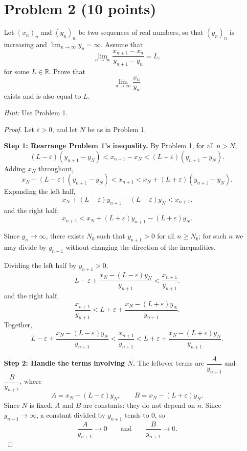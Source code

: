 \documentclass[11pt]{article}
\begin{document}
\section*{Problem 2 (10 points)}
Let $(x_n)_n$ and $(y_n)_n$ be two sequences of real numbers, so that
$(y_n)_n$ is increasing and $\lim_{n\to\infty}y_n=\infty$. Assume that
\[
  \lim_{n\to\infty}\frac{x_{n+1}-x_n}{y_{n+1}-y_n} = L,
\]
for some $L\in\mathbb{R}$. Prove that
\[
  \lim_{n\to\infty}\frac{x_n}{y_n}
\]
exists and is also equal to $L$.

\noindent\emph{Hint:} Use Problem 1.

\begin{proof}

Let $\varepsilon>0$, and let $N$ be as in Problem 1.

\textbf{Step 1: Rearrange Problem 1's inequality.}
By Problem 1, for all $n>N$,
\[
  (L-\varepsilon)(y_{n+1}-y_N) < x_{n+1}-x_N < (L+\varepsilon)(y_{n+1}-y_N).
\]
Adding $x_N$ throughout,
\[
  x_N+(L-\varepsilon)(y_{n+1}-y_N) < x_{n+1} < x_N+(L+\varepsilon)(y_{n+1}-y_N).
\]
Expanding the left half,
\[
  x_N+(L-\varepsilon)y_{n+1}-(L-\varepsilon)y_N < x_{n+1} .
\]
and the right half,
\[
  x_{n+1} < x_N+(L+\varepsilon)y_{n+1}-(L+\varepsilon)y_N .
\]

Since $y_n\to\infty$, there exists $N_0$ such that $y_{n+1}>0$ for all
$n\ge N_0$; for such $n$ we may divide by $y_{n+1}$ without changing the
direction of the inequalities.

Dividing the left half by $y_{n+1}>0$,
\[
  L-\varepsilon + \frac{x_N-(L-\varepsilon)y_N}{y_{n+1}} < \frac{x_{n+1}}{y_{n+1}} .
\]
and the right half,
\[
  \frac{x_{n+1}}{y_{n+1}} < L+\varepsilon + \frac{x_N-(L+\varepsilon)y_N}{y_{n+1}} .
\]
Together,
\[
  L-\varepsilon + \frac{x_N-(L-\varepsilon)y_N}{y_{n+1}}
  < \frac{x_{n+1}}{y_{n+1}}
  < L+\varepsilon + \frac{x_N-(L+\varepsilon)y_N}{y_{n+1}} .
\]

\textbf{Step 2: Handle the terms involving $N$.}
The leftover terms are $\dfrac{A}{y_{n+1}}$ and $\dfrac{B}{y_{n+1}}$, where
\[
  A = x_N-(L-\varepsilon)y_N, \qquad B = x_N-(L+\varepsilon)y_N .
\]
Since $N$ is fixed, $A$ and $B$ are constants: they do not depend on $n$.
Since $y_{n+1}\to\infty$, a constant divided by $y_{n+1}$ tends to $0$, so
\[
  \frac{A}{y_{n+1}}\to 0 \qquad\text{and}\qquad \frac{B}{y_{n+1}}\to 0 .
\]


\end{proof}
\end{document}
